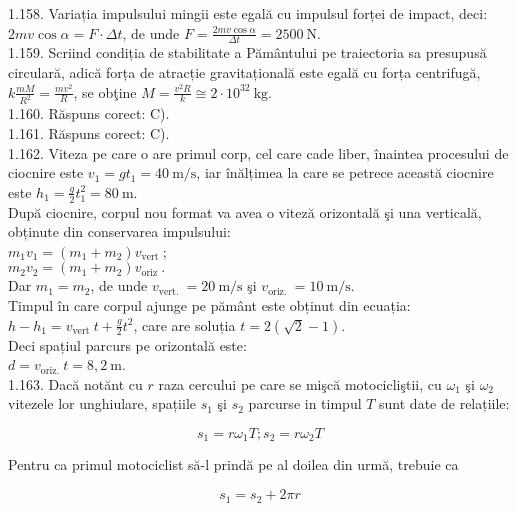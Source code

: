 1.158. Variația impulsului mingii este egală cu impulsul forței de impact, deci: $2 m v \cos \alpha=F \cdot \Delta t$, de unde $F=\frac{2 m v \cos \alpha}{\Delta t}=2500 \mathrm{~N}$.\\

1.159. Scriind condiția de stabilitate a Pământului pe traiectoria sa presupusă circulară, adică forța de atracție gravitațională este egală cu forța centrifugă, $k \frac{m M}{R^{2}}=\frac{m v^{2}}{R}$, se obţine $M=\frac{v^{2} R}{k} \cong 2 \cdot 10^{32} \mathrm{~kg}$.\\

1.160. Răspuns corect: C).\\

1.161. Răspuns corect: C).\\

1.162. Viteza pe care o are primul corp, cel care cade liber, înaintea procesului de ciocnire este $v_{1}=g t_{1}=40 \mathrm{~m} / \mathrm{s}$, iar înălțimea la care se petrece această ciocnire este $h_{1}=\frac{g}{2} t_{1}^{2}=80 \mathrm{~m}$.\\ După ciocnire, corpul nou format va avea o viteză orizontală şi una verticală, obținute din conservarea impulsului:\\ $m_{1} v_{1}=\left(m_{1}+m_{2}\right) v_{\text {vert }}$;\\ $m_{2} v_{2}=\left(m_{1}+m_{2}\right) v_{\text {oriz }}.$\\ Dar $m_{1}=m_{2}$, de unde $v_{\text {vert. }}=20 \mathrm{~m} / \mathrm{s}$ şi $v_{\text {oriz. }}=10 \mathrm{~m} / \mathrm{s}$.\\ Timpul în care corpul ajunge pe pământ este obținut din ecuația:\\ $h-h_{1}=v_{\text {vert }} t+\frac{g}{2} t^{2}$, care are soluția $t=2(\sqrt{2}-1)$.\\ Deci spațiul parcurs pe orizontală este:\\ $d=v_{\text {oriz. }} t=8,2 \mathrm{~m}$.\\

1.163. Dacă notănt cu $r$ raza cercului pe care se mişcă motocicliştii, cu $\omega_{1}$ şi $\omega_{2}$ vitezele lor unghiulare, spațiile $s_{1}$ şi $s_{2}$ parcurse in timpul $T$ sunt date de relațiile:

$$
s_{1}=r \omega_{1} T ; s_{2}=r \omega_{2} T
$$

Pentru ca primul motociclist să-l prindă pe al doilea din urmă, trebuie ca

$$
s_{1}=s_{2}+2 \pi r
$$

